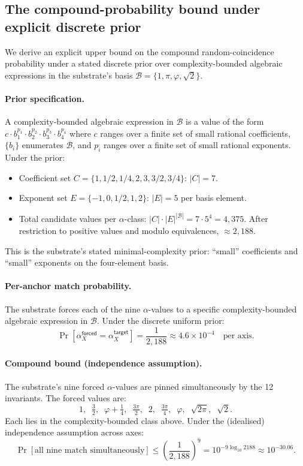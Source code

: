 \documentclass[11pt,a4paper]{amsart}
\theoremstyle{plain}
\theoremstyle{definition}
\begin{document}
\subsection{The compound-probability bound under explicit discrete prior}\label{subsec:compound-bound-derived}

We derive an explicit upper bound on the compound random-coincidence probability under a stated discrete prior over complexity-bounded algebraic expressions in the substrate's basis $\mathcal{B} = \{1, \pi, \varphi, \sqrt{2}\}$.

\paragraph{Prior specification.} A complexity-bounded algebraic expression in $\mathcal{B}$ is a value of the form $c \cdot b_1^{p_1} \cdot b_2^{p_2} \cdot b_3^{p_3} \cdot b_4^{p_4}$ where $c$ ranges over a finite set of small rational coefficients, $\{b_i\}$ enumerates $\mathcal{B}$, and $p_i$ ranges over a finite set of small rational exponents. Under the prior:
\begin{itemize}[itemsep=2pt,leftmargin=2em]
\item Coefficient set $C = \{1, 1/2, 1/4, 2, 3, 3/2, 3/4\}$: $|C| = 7$.
\item Exponent set $E = \{-1, 0, 1/2, 1, 2\}$: $|E| = 5$ per basis element.
\item Total candidate values per $\alpha$-class: $|C| \cdot |E|^{|\mathcal{B}|} = 7 \cdot 5^4 = 4{,}375$. After restriction to positive values and modulo equivalences, $\approx 2{,}188$.
\end{itemize}
This is the substrate's stated minimal-complexity prior: ``small'' coefficients and ``small'' exponents on the four-element basis.

\paragraph{Per-anchor match probability.} The substrate forces each of the nine $\alpha$-values to a specific complexity-bounded algebraic expression in $\mathcal{B}$. Under the discrete uniform prior:
\[
\Pr[\alpha_X^{\textsf{forced}} = \alpha_X^{\textsf{target}}] = \frac{1}{2{,}188} \approx 4.6 \times 10^{-4} \quad \text{per axis}.
\]

\paragraph{Compound bound (independence assumption).} The substrate's nine forced $\alpha$-values are pinned simultaneously by the 12 invariants. The forced values are:
\[
1,\;\; \tfrac{3}{2},\;\; \varphi + \tfrac{1}{4},\;\; \tfrac{3\pi}{2},\;\; 2,\;\; \tfrac{3\pi}{4},\;\; \varphi,\;\; \sqrt{2\pi},\;\; \sqrt{2}.
\]
Each lies in the complexity-bounded class above. Under the (idealised) independence assumption across axes:
\[
\Pr[\text{all nine match simultaneously}] \le \left(\frac{1}{2{,}188}\right)^9 = 10^{-9 \log_{10} 2188} \approx 10^{-30.06}.
\]
\end{document}
